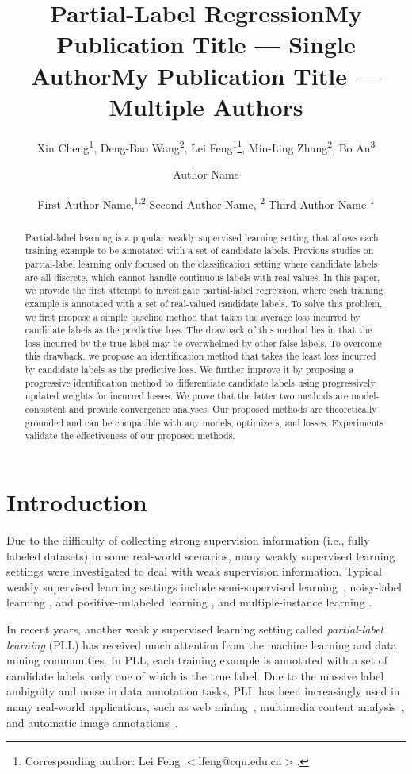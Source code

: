\documentclass[letterpaper]{article} %
\title{Partial-Label Regression}
\author{
Xin Cheng\textsuperscript{\rm 1}, Deng-Bao Wang\textsuperscript{\rm 2}, Lei Feng\textsuperscript{\rm 1}\thanks{Corresponding author: Lei Feng $<$lfeng@cqu.edu.cn$>$.}, Min-Ling Zhang\textsuperscript{\rm 2}, Bo An\textsuperscript{\rm 3}
}
\title{My Publication Title --- Single Author}
\author {
    Author Name
}
\title{My Publication Title --- Multiple Authors}
\author {
    First Author Name,\textsuperscript{\rm 1,\rm 2}
    Second Author Name, \textsuperscript{\rm 2}
    Third Author Name \textsuperscript{\rm 1}
}
\begin{document}
\maketitle
\begin{abstract}
Partial-label learning is a popular weakly supervised learning setting that allows each training example to be annotated with a set of candidate labels. Previous studies on partial-label learning only focused on the classification setting where candidate labels are all discrete, which cannot handle continuous labels with real values. In this paper, we provide the first attempt to investigate partial-label regression, where each training example is annotated with a set of real-valued candidate labels. To solve this problem, we first propose a simple baseline method that takes the average loss incurred by candidate labels as the predictive loss. The drawback of this method lies in that the loss incurred by the true label may be overwhelmed by other false labels. To overcome this drawback, we propose an identification method that takes the least loss incurred by candidate labels as the predictive loss. We further improve it by proposing a progressive identification method to differentiate candidate labels using progressively updated weights for incurred losses. We prove that the latter two methods are model-consistent and provide convergence analyses. Our proposed methods are theoretically grounded and can be compatible with any models, optimizers, and losses. Experiments validate the effectiveness of our proposed methods.
\end{abstract}

\section{Introduction}
Due to the difficulty of collecting strong supervision information (i.e., fully labeled datasets) in some real-world scenarios, many weakly supervised learning settings were investigated to deal with weak supervision information. Typical weakly supervised learning settings include semi-supervised learning~\cite{Chapelle2006semi,sohn2020fixmatch}, noisy-label learning \cite{liu2015classification,malach2017decoupling,patrini2017making}, and positive-unlabeled learning \cite{elkan2008learning,niu2016theoretical,Kiryo2017Positive}, and multiple-instance learning \cite{maron1997framework,andrews2002support}.

In recent years, another weakly supervised learning setting called \emph{partial-label learning} (PLL) \cite{cour2011learning} has received much attention from the machine learning and data mining communities. In PLL, each training example is annotated with a set of candidate labels, only one of which is the true label. Due to the massive label ambiguity and noise in data annotation tasks, PLL has been increasingly used in many real-world applications, such as web mining~\cite{luo2010learning}, multimedia content analysis~\cite{zeng2013learning}, and automatic image annotations~\cite{chen2018learning}.
\end{document}
